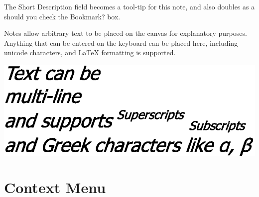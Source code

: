 The Short Description field becomes a tool-tip for this note, and
also doubles as a  should you check the
Bookmark? box. 

Notes allow arbitrary text to be placed on the canvas for explanatory
purposes. Anything that can be entered on the keyboard can be placed
here, including unicode characters, and \LaTeX{} formatting is supported. 

\includegraphics{images/Note+Text}

\section{Context Menu}

